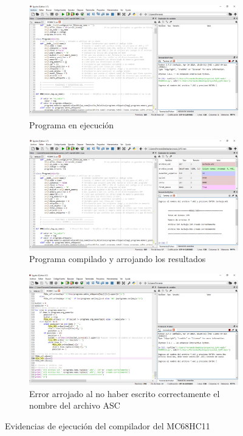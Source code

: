 \documentclass[letterpaper]{report}
\begin{document}
    \begin{figure}[!ht]
        \centering
        \begin{subfigure}{10cm}
            \includegraphics[width = 10cm]{img/E1}
            \caption{Programa en ejecución}
        \end{subfigure}
        \begin{subfigure}{10cm}
            \includegraphics[width = 10cm]{img/E2}
            \caption{Programa compilado y arrojando los resultados}
        \end{subfigure}
        \begin{subfigure}{10cm}
            \includegraphics[width = 10cm]{img/E3}
            \caption{Error arrojado al no haber escrito correctamente el nombre
            del archivo ASC}
        \end{subfigure}
        \caption{Evidencias de ejecución del compilador del MC68HC11}
    \end{figure}
\end{document}
